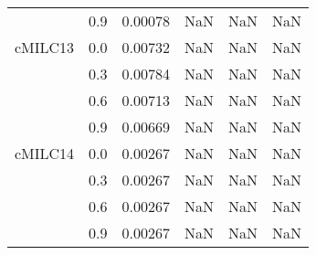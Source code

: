 \begin{longtable}{cccccc}
        & 0.9 & 0.00078 & NaN & NaN & NaN \\
cMILC13 & 0.0 & 0.00732 & NaN & NaN & NaN \\
        & 0.3 & 0.00784 & NaN & NaN & NaN \\
        & 0.6 & 0.00713 & NaN & NaN & NaN \\
        & 0.9 & 0.00669 & NaN & NaN & NaN \\
cMILC14 & 0.0 & 0.00267 & NaN & NaN & NaN \\
        & 0.3 & 0.00267 & NaN & NaN & NaN \\
        & 0.6 & 0.00267 & NaN & NaN & NaN \\
        & 0.9 & 0.00267 & NaN & NaN & NaN \\
\end{longtable}
